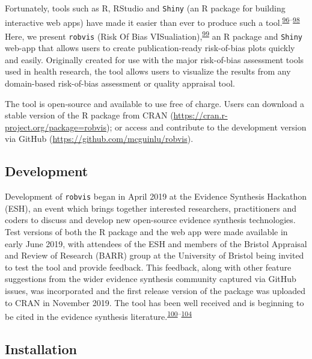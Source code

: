 \documentclass[a4paper, twoside]{templates/ociamthesis}
\begin{document}
Fortunately, tools such as R, RStudio and \texttt{Shiny} (an R package for building interactive web apps) have made it easier than ever to produce such a tool.\textsuperscript{\protect\hyperlink{ref-rref}{96}--\protect\hyperlink{ref-shinyref}{98}} Here, we present \texttt{robvis} (Risk Of Bias VISualiation),\textsuperscript{\protect\hyperlink{ref-mcguinness2019a}{99}} an R package and \texttt{Shiny} web-app that allows users to create publication-ready risk-of-bias plots quickly and easily. Originally created for use with the major risk-of-bias assessment tools used in health research, the tool allows users to visualize the results from any domain-based risk-of-bias assessment or quality appraisal tool.

The tool is open-source and available to use free of charge. Users can download a stable version of the R package from CRAN (\url{https://cran.r-project.org/package=robvis}); or access and contribute to the development version via GitHub (\url{https://github.com/mcguinlu/robvis}).

\hypertarget{development-1}{%
\subsection{Development}\label{development-1}}

Development of \texttt{robvis} began in April 2019 at the Evidence Synthesis Hackathon (ESH), an event which brings together interested researchers, practitioners and coders to discuss and develop new open-source evidence synthesis technologies. Test versions of both the R package and the web app were made available in early June 2019, with attendees of the ESH and members of the Bristol Appraisal and Review of Research (BARR) group at the University of Bristol being invited to test the tool and provide feedback. This feedback, along with other feature suggestions from the wider evidence synthesis community captured via GitHub issues, was incorporated and the first release version of the package was uploaded to CRAN in November 2019. The tool has been well received and is beginning to be cited in the evidence synthesis literature.\textsuperscript{\protect\hyperlink{ref-gibb2019consistent}{100}--\protect\hyperlink{ref-tanneru2020}{104}}

\hypertarget{installation-1}{%
\subsection{Installation}\label{installation-1}}
\end{document}
